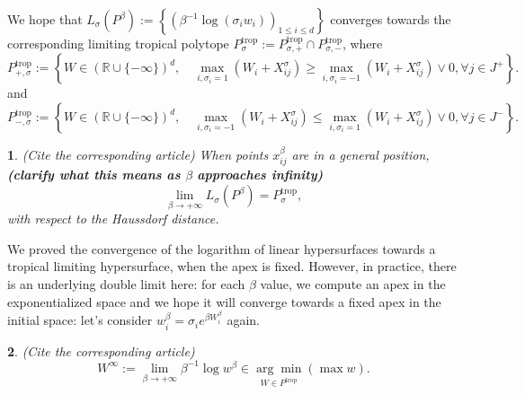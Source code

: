 \documentclass[oneside,english,a4paper]{amsart}
\numberwithin{equation}{section}
\numberwithin{figure}{section}
\theoremstyle{plain}
\newtheorem{thm}{\protect\theoremname}
\theoremstyle{definition}
\theoremstyle{plain}
\theoremstyle{remark}
\theoremstyle{plain}
\theoremstyle{definition}
\theoremstyle{definition}
\providecommand{\theoremname}{Theorem}
\begin{document}
We hope that $L_{\sigma}(P^{\beta}):=\left\{ (\beta^{-1}\log(\sigma_{i}w_{i}))_{1\le i\le d}\right\} $
converges towards the corresponding limiting tropical polytope $P_{\sigma}^{\text{trop}}:=P_{\sigma,+}^{\text{trop}}\cap P_{\sigma,-}^{\text{trop}}$,
where 
\[
P_{+,\sigma}^{\text{trop}}:=\left\{ W\in(\mathbb{R}\cup\{-\infty\})^{d},\quad\max_{i,\sigma_{i}=1}(W_{i}+X_{ij}^{\sigma})\ge\max_{i,\sigma_{i}=-1}(W_{i}+X_{ij}^{\sigma})\vee0,\forall j\in J^{+}\right\} .
\]
and 
\[
P_{-,\sigma}^{\text{trop}}:=\left\{ W\in(\mathbb{R}\cup\{-\infty\})^{d},\quad\max_{i,\sigma_{i}=-1}(W_{i}+X_{ij}^{\sigma})\le\max_{i,\sigma_{i}=1}(W_{i}+X_{ij}^{\sigma})\vee0,\forall j\in J^{-}\right\} .
\]

\begin{thm}
(Cite the corresponding article) When points $x_{ij}^{\beta}$ are
in a general position, \textbf{(clarify what this means as $\beta$}
\textbf{approaches infinity)} 
\[
\lim_{\beta\rightarrow+\infty}L_{\sigma}(P^{\beta})=P_{\sigma}^{\text{trop}},
\]
with respect to the Haussdorf distance. 
\end{thm}

We proved the convergence of the logarithm of linear hypersurfaces
towards a tropical limiting hypersurface, when the apex is fixed.
However, in practice, there is an underlying double limit here: for
each $\beta$ value, we compute an apex in the exponentialized space
and we hope it will converge towards a fixed apex in the initial space:
let's consider $w_{i}^{\beta}=\sigma_{i}e^{\beta W_{i}^{\beta}}$
again. 
\begin{thm}
(Cite the corresponding article) 
\[
W^{\infty}:=\lim_{\beta\rightarrow+\infty}\beta^{-1}\log w^{\beta}\in\underset{W\in P^{\text{trop}}}{\arg\min}\left(\max w\right).
\]
\end{thm}


\newpage{} 

\end{document}
